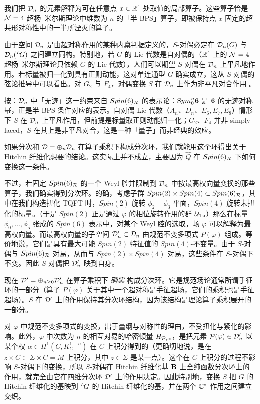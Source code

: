 我们把 ${\EUD}_n$ 的元素解释为可在任意点 $x\in \Bbb{R}^4$ 处取值的局部算子。这些算子恰是 ${\EUN}=4$ 超杨--米尔斯理论中维数为 $n$ 的「半 BPS」算子，即被保持点 $x$ 固定的超共形对称性中的一半所湮灭的算子。

由于空间 ${\EUD}_n$ 是由超对称作用的某种内禀判据定义的，$S$-对偶必定在 ${\EUD}_n(G)$ 与 ${\EUD}_n(\LG)$ 之间建立同构。特别地，若 $G$ 的 Lie 代数是自对偶的（$\Bbb{R}^4$ 上的 ${\EUN}=4$ 超杨--米尔斯理论只依赖 $G$ 的 Lie 代数），人们可以期望 $S$-对偶在 ${\EUD}_n$ 上平凡地作用。若标量被归一化到具有正则动能，这对单连通型 $G$ 确实成立，这从 $S$-对偶的弦论推导中可以看出。对 $G_2$ 与 $F_4$，对偶变换 $S$ 在 ${\EUD}_n$ 上作为非平凡对合作用 \cite{ref47}。

\begin{yizhu}[物理图像]
按：${\EUD}_n$ 中「无迹」这一约束来自 $Spin(6)_{\cal R}$ 的表示论：${\rm Sym}_0^n{\bf 6}$ 是 ${\bf 6}$ 的无迹对称幂，正是半 BPS 条件对应的表示。自对偶 Lie 代数（$A_n$、$D_n$、$E_6,E_7,E_8$）情形下 $S$ 在 ${\EUD}_n$ 上平凡作用，但前提是标量取正则动能归一化；$G_2$、$F_4$ 并非 simply-laced，$S$ 在其上是非平凡对合，这是一种「量子」而非经典的效应。
\end{yizhu}

如果分次和 ${\EUD}=\oplus_n {\EUD}_n$ 在算子乘积下构成分次环，我们就能用这个环得出关于 Hitchin 纤维化想要的结论。这实际上并不成立，主要因为 $\hat Q$ 在 $Spin(6)_{\cal R}$ 下如何变换这一条件。

不过，若固定 $Spin(6)_{\cal R}$ 的一个 Weyl 腔并限制到 ${\EUD}_n$ 中按最高权向量变换的那些算子，我们确实得到分次环。的确，考虑子群 $Spin(2)\times Spin(4)\subset Spin(6)_{{\cal R}}$，其中在我们构造扭化 TQFT 时，$Spin(2)$ 旋转 $\phi_2-\phi_3$ 平面，$Spin(4)$ 旋转未扭化的标量。（于是 $Spin(2)$ 正是通过 $\varphi$ 的相位旋转作用的群 ${\cal U}_1$。）那么在标量 $\phi_0,\dots,\phi_5$ 张成的 $Spin(6)$ 表示中，对某个 Weyl 腔的选取，场 $\varphi$ 可以解释为最高权向量。而最高权向量的子空间 ${\EUD}'_n\subset {\EUD}_n$ 由规范不变多项式 $P(\varphi)$ 组成。等价地说，它们是具有最大可能 $Spin(2)$ 特征值的 $Spin(4)$-不变量。由于 $S$-对偶与 $Spin(6)_{\cal R}$ 对易，从而与 $Spin(2)\times Spin(4)$ 对易，这些条件在 $S$-对偶下不变。因此 $S$-对偶把 ${\EUD}'_n$ 映到自身。

现在 ${\EUD}'=\oplus_{n\geq 0}{\EUD}'_n$ 在算子乘积下 {\it 确实} 构成分次环。它是规范场论通常所谓手征环的一部分（算子 $P(\varphi)$ 关于其中一个超对称是手征超场，它们的乘积也是手征超场）。$S$ 在 ${\EUD}'$ 上的作用保持其分次环结构，因为该结构是理论算子乘积展开的一部分。

对 $\varphi$ 中规范不变多项式的变换，出于量纲与对称性的理由，不受扭化与紧化的影响。此外，$\varphi$ 中次数为 $n$ 的相互对易的哈密顿量 $H_{{\cal P},\alpha}$，是把元素 ${\cal P}(\varphi)\in\EUD'_n$ 以某个权 $\alpha\in H^1(C,K_C^{1-n})$ 在 $C$ 上积分得到的（更确切地说，是在 $z\times C\subset \Sigma\times C=M$ 上积分，其中 $z\in\Sigma$ 是某一点）。这个在 $C$ 上积分的过程不影响 $S$-对偶下的变换，所以 $S$-对偶在 Hitchin 纤维化基 ${\EUBB}$ 上全纯函数分次环上的作用，就完全由它在四维分次环 $\EUD'$ 上的作用决定。因此特别地，变换 $S$ 把 $G$ 的 Hitchin 纤维化的基映到 $^L\negthinspace G$ 的 Hitchin 纤维化的基，并在两个 $\Bbb{C}^*$ 作用之间建立交织。

